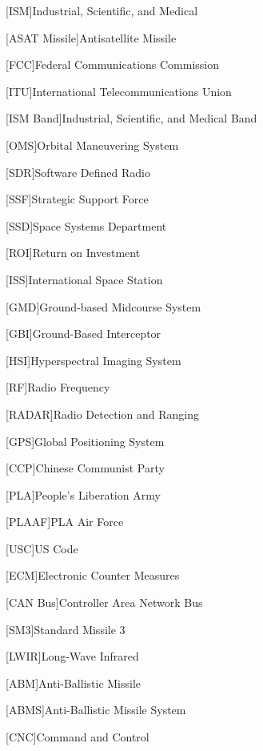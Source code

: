 
[ISM]{Industrial, Scientific, and Medical}

[ASAT Missile]{Antisatellite Missile}

[FCC]{Federal Communications Commission}

[ITU]{International Telecommunications Union}

[ISM Band]{Industrial, Scientific, and Medical Band}

[OMS]{Orbital Maneuvering System}

[SDR]{Software Defined Radio}

[SSF]{Strategic Support Force}

[SSD]{Space Systems Department}

[ROI]{Return on Investment}

[ISS]{International Space Station}

[GMD]{Ground-based Midcourse System}

[GBI]{Ground-Based Interceptor}

[HSI]{Hyperspectral Imaging System}

[RF]{Radio Frequency}

[RADAR]{Radio Detection and Ranging}

[GPS]{Global Positioning System}

[CCP]{Chinese Communist Party}

[PLA]{People's Liberation Army}

[PLAAF]{PLA Air Force}

[USC]{US Code}

[ECM]{Electronic Counter Measures}

[CAN Bus]{Controller Area Network Bus}

[SM3]{Standard Missile 3}

[LWIR]{Long-Wave Infrared}

[ABM]{Anti-Ballistic Missile}

[ABMS]{Anti-Ballistic Missile System}

[CNC]{Command and Control}

